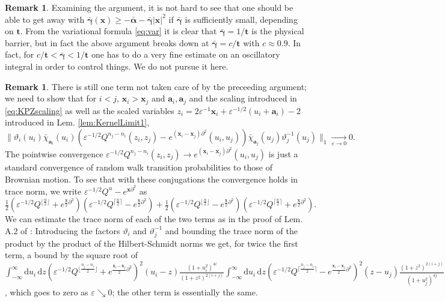 \documentclass[letterpaper,reqno,11pt,oneside,final]{amsart}
\theoremstyle{definition}
\newtheorem{rem}[thm]{Remark}
\newcommand{\p}{\partial}
\newcommand{\ep}{\varepsilon}
\renewcommand{\d}{\mathrm{d}}
\newcommand{\ft}{\mathbf{t}}
\newcommand{\fx}{\mathbf{x}}
\newcommand{\fa}{\mathbf{a}}
\newcommand{\gga}{\bar{\bm{\alpha}}}
\newcommand{\g}{\bar{\bm{\gamma}}}
\numberwithin{equation}{section}
\begin{document}
\begin{rem}
 Examining the argument, it is not hard to see that one should be able to get away with $\g(\fx) \ge -\gga - \g |\fx|^2$ if $\g$ is sufficiently small, depending on $\ft$.
From the variational formula \eqref{eq:var} it is clear that $\g=1/\ft$ is the physical barrier, but in fact the above argument breaks down at $\g= c/\ft$ with $c\approx 0.9$.
In fact, for $c/\ft <\g<1/\ft$ one has to do a very fine estimate on an oscillatory integral in order to control things.  
We do not pursue it here.
\end{rem}
 
\begin{rem}\label{rem:rwtoBMconjug}
There is still one term not taken care of by the preceeding argument; we need to show that for  $i<j$, $\fx_i>\fx_j$ and $\fa_i,\fa_j$ and the scaling introduced in \eqref{eq:KPZscaling} as well as the scaled variables $z_i=2\ep^{-1}\fx_i+\ep^{-1/2}(u_i+\fa_i)-2$ introduced in Lem. \ref{lem:KernelLimit1},
\begin{equation}
\label{convergence1a}
\Big\|{\vartheta_i( u_i)}\bar\chi_{\fa_i}(u_i)\!\left(\ep^{-1/2}Q^{n_j-n_i}(z_i,z_j)- e^{(\fx_i-\fx_j)\p^2}(u_i,u_j) \right)\!\bar\chi_{\fa_j}(u_j)\vartheta_j^{-1}( u_j) \Big\|_1\xrightarrow[\ep\to0]{}0.
\end{equation}
The pointwise convergence $\ep^{-1/2}Q^{n_j-n_i}(z_i,z_j)\longrightarrow e^{(\fx_i-\fx_j)\p^2}(u_i,u_j)$ is just a standard convergence of random walk transition probabilities
to those of Brownian motion.
To see that with these conjugations the convergence holds in trace norm, we write $\ep^{-1/2}Q^{n}- e^{\fx\p^2}$ as
\begin{equation}
\tfrac12( \ep^{-1/2}Q^{\lfloor \frac{n}2\rfloor}+e^{\frac{\fx}2\p^2})( \ep^{-1/2}Q^{\lceil \frac{n}2\rceil}- e^{\frac{\fx}2\p^2})+\tfrac12( \ep^{-1/2}Q^{\lfloor \frac{n}2\rfloor}-e^{\frac{\fx}2\p^2})( \ep^{-1/2}Q^{\lceil \frac{n}2\rceil}+ e^{\frac{\fx}2\p^2}).
\end{equation}
We can estimate the trace norm of each of the two terms as in the proof of Lem. A.2 of \cite{bfp}: Introducing the factors $\vartheta_i$ and $\vartheta_j^{-1}$ and bounding the trace norm of the product by the product of the Hilbert-Schmidt norms we get, for twice the first term, a bound by the square root of
$
\int_{-\infty}^\infty\d u_i\,\d z(  \ep^{-1/2}Q^{\lfloor \frac{n_j-n_i}2\rfloor}+e^{\frac{\fx_i-\fx_j}2\p^2})^2(u_i-z)\frac{(1+u_i^2)^{4i}}{ (1+z^2)^{2(i+j)}}
\int_{-\infty}^\infty\d u_i\,\d z(  \ep^{-1/2}Q^{\lceil \frac{n_j-n_i}2\rceil}-e^{\frac{\fx_i-\fx_j}2\p^2})^2(z-u_j)\frac{(1+z^2)^{2(i+j)}}{ (1+u_j^2)^{4j}}
$,
which goes to zero as $\ep\searrow0$; the other term is essentially the same.
\end{rem}
\end{document}
